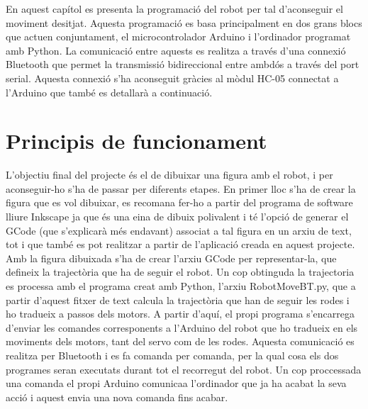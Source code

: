 






En aquest capítol es presenta la programació del robot per tal d’aconseguir el moviment desitjat. Aquesta programació es basa principalment en dos grans blocs que actuen conjuntament, el microcontrolador Arduino i l’ordinador programat amb Python. La comunicació entre aquests es realitza a través d’una connexió Bluetooth que permet la transmissió bidireccional entre ambdós a través del port serial. Aquesta connexió s’ha aconseguit gràcies al mòdul HC-05 connectat a l’Arduino que també es detallarà a continuació.


\section{Principis de funcionament}

L’objectiu final del projecte és el de dibuixar una figura amb el robot, i per aconseguir-ho s’ha de passar per diferents etapes. En primer lloc s’ha de crear la figura que es vol dibuixar, es recomana fer-ho a partir del programa de software lliure Inkscape ja que és una eina de dibuix polivalent i té l’opció de generar el GCode (que s’explicarà més endavant) associat a tal figura en un arxiu de text, tot i que també es pot realitzar a partir de l’aplicació creada en aquest projecte. Amb la figura dibuixada s’ha de crear l’arxiu GCode per representar-la, que defineix la trajectòria que ha de seguir el robot. Un cop obtinguda la trajectoria es processa amb el programa creat amb Python, l’arxiu RobotMoveBT.py, que a partir d’aquest fitxer de text calcula la trajectòria que han de seguir les rodes i ho tradueix a passos dels motors. A partir d’aquí, el propi programa s’encarrega d’enviar les comandes corresponents a l’Arduino del robot que ho tradueix en els moviments dels motors, tant del servo com de les rodes. Aquesta comunicació es realitza per Bluetooth i es fa comanda per comanda, per la qual cosa els dos programes seran  executats durant tot el recorregut del robot. Un cop proccessada una comanda el propi Arduino comunicaa l'ordinador que ja ha acabat la seva acció i aquest envia una nova comanda fins acabar.


